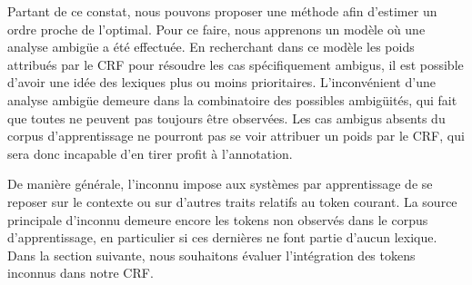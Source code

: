 \documentclass[citation\_needed]{subfiles}
\begin{document}
Partant de ce constat, nous pouvons proposer une méthode afin d'estimer un ordre proche de l'optimal. Pour ce faire, nous apprenons un modèle où une analyse ambigüe a été effectuée. En recherchant dans ce modèle les poids attribués par le CRF pour résoudre les cas spécifiquement ambigus, il est possible d'avoir une idée des lexiques plus ou moins prioritaires. L'inconvénient d'une analyse ambigüe demeure dans la combinatoire des possibles ambigüités, qui fait que toutes ne peuvent pas toujours être observées. Les cas ambigus absents du corpus d'apprentissage ne pourront pas se voir attribuer un poids par le CRF, qui sera donc incapable d'en tirer profit à l'annotation.

De manière générale, l'inconnu impose aux systèmes par apprentissage de se reposer sur le contexte ou sur d'autres traits relatifs au token courant. La source principale d'inconnu demeure encore les tokens non observés dans le corpus d'apprentissage, en particulier si ces dernières ne font partie d'aucun lexique. Dans la section suivante, nous souhaitons évaluer l'intégration des tokens inconnus dans notre CRF.
\end{document}
